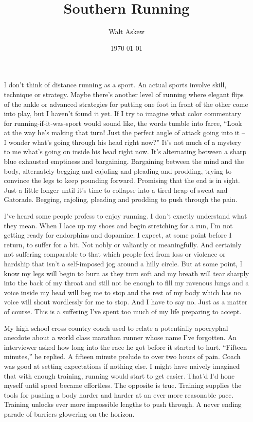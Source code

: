 \documentclass[12pt, oneside]{memoir}
\title{Southern Running}
\author{Walt Askew}
\date{\today}
\begin{document}
\maketitle

I don't think of distance running as a sport.
An actual sports involve skill, technique or strategy.
Maybe there's another level of running where elegant flips of the
ankle or advanced strategies for putting one foot in front of the
other come into play, but I haven't found it yet.
If I try to imagine what color commentary for running-if-it-was-sport
would sound like, the words tumble into farce,
``Look at the way he's making that turn! Just the perfect angle of
attack going into it -- I wonder what's going through his head right
now?''
It's not much of a mystery to me what's going on inside his head right
now. 
It's alternating between a sharp blue exhausted emptiness and
bargaining.
Bargaining between the mind and the body, alternately begging and
cajoling and pleading and prodding, trying to convince the legs to
keep pounding forward.
Promising that the end is in sight.
Just a little longer until it's time to collapse into a tired heap of
sweat and Gatorade. 
Begging, cajoling, pleading and prodding to push through the pain.

I've heard some people profess to enjoy running.
I don't exactly understand what they mean.
When I lace up my shoes and begin stretching for a run, I'm not
getting ready for endorphins and dopamine.
I expect, at some point before I return, to suffer for a bit.
Not nobly or valiantly or meaningfully.
And certainly not suffering comparable to that which people feel from
loss or violence or hardship that isn't a self-imposed jog around a
hilly circle.
But at some point, I know my legs will begin to burn as they turn
soft and my breath will tear sharply into the back of my throat and
still not be enough to fill my ravenous lungs and a voice inside my
head will beg me to stop and the rest of my body which has no voice
will shout wordlessly for me to stop.
And I have to say no.
Just as a matter of course.
This is a suffering I've spent too much of my life preparing to
accept.

My high school cross country coach used to relate a potentially
apocryphal anecdote about a world class marathon runner whose name
I've forgotten.
An interviewer asked how long into the race he got before it started
to hurt.
``Fifteen minutes,'' he replied.
A fifteen minute prelude to over two hours of pain.
Coach was good at setting expectations if nothing else.
I might have naively imagined that with enough training,
running would start to get easier.
That'd I'd hone myself until speed became effortless.
The opposite is true.
Training supplies the tools for pushing a body harder and harder at an
ever more reasonable pace.
Training unlocks ever more impossible lengths to push through.
A never ending parade of barriers glowering on the horizon.
\end{document}
